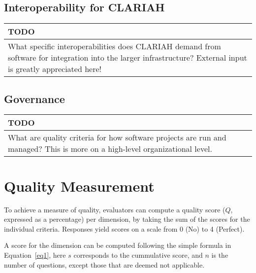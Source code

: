 \documentclass[a4paper,11pt]{article}
\newenvironment{TODO}{
\begin{center}
    \begin{tabular}[h!]{|p{0.8\textwidth}|}
    \hline
    {\bf TODO}\\\hline}
{   \\\hline
    \end{tabular}
\end{center}}
\begin{document}
\subsection{Interoperability for CLARIAH}\label{sec:intCLA}


\begin{TODO} 
What specific interoperabilities does CLARIAH demand from software for
integration into the larger infrastructure?  External input is greatly
appreciated here!
\end{TODO}


\subsection{Governance}\label{sec:gov}




\begin{TODO} 
What are quality criteria for how software projects are run and
managed? This is more on a high-level organizational level.
\end{TODO}


\section{Quality Measurement}

To achieve a measure of quality, evaluators can compute a quality score ($Q$,
expressed as a percentage) per dimension, by taking the sum of the scores for
the individual criteria. Responses yield scores on a scale from 0 (No) to 4 (Perfect). 

A score for the dimension can be computed following the simple formula in
Equation~\ref{eq1}, here $s$ corresponds to the cummulative score, and $n$ is
the number of questions, except those that are deemed not applicable.
\end{document}
